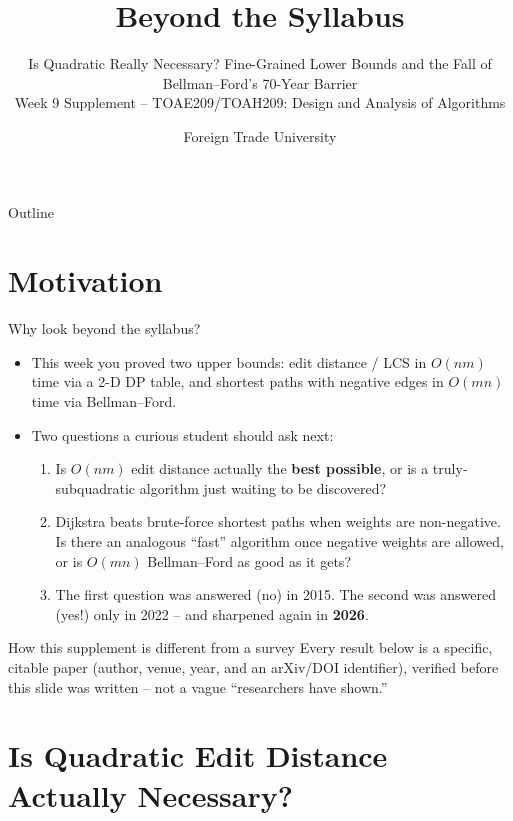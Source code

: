 \documentclass[11pt,aspectratio=169]{beamer}
\title{Beyond the Syllabus}
\subtitle{Is Quadratic Really Necessary? Fine-Grained Lower Bounds and the Fall of
Bellman--Ford's 70-Year Barrier\\
\small Week 9 Supplement -- TOAE209/TOAH209: Design and Analysis of Algorithms}
\author{Foreign Trade University}
\date{}
\begin{document}
\begin{frame}
  \titlepage
\end{frame}

\begin{frame}{Outline}
  \tableofcontents
\end{frame}

\section{Motivation}

\begin{frame}{Why look beyond the syllabus?}
  \begin{itemize}
    \item This week you proved two upper bounds: edit distance / LCS in
    $O(nm)$ time via a 2-D DP table, and shortest paths with negative edges in
    $O(mn)$ time via Bellman--Ford.
    \item Two questions a curious student should ask next:
    \begin{enumerate}
      \item Is $O(nm)$ edit distance actually the \textbf{best possible}, or is a
      truly-subquadratic algorithm just waiting to be discovered?
      \item Dijkstra beats brute-force shortest paths when weights are non-negative.
      Is there an analogous ``fast'' algorithm once negative weights are allowed, or is
      $O(mn)$ Bellman--Ford as good as it gets?
      \item[$\to$] The first question was answered (no) in 2015. The second was answered
      (yes!) only in 2022 -- and sharpened again in \textbf{2026}.
    \end{enumerate}
  \end{itemize}
  \begin{alertblock}{How this supplement is different from a survey}
    Every result below is a specific, citable paper (author, venue, year, and an
    arXiv/DOI identifier), verified before this slide was written -- not a vague
    ``researchers have shown.''
  \end{alertblock}
\end{frame}

\section{Is Quadratic Edit Distance Actually Necessary?}
\end{document}
